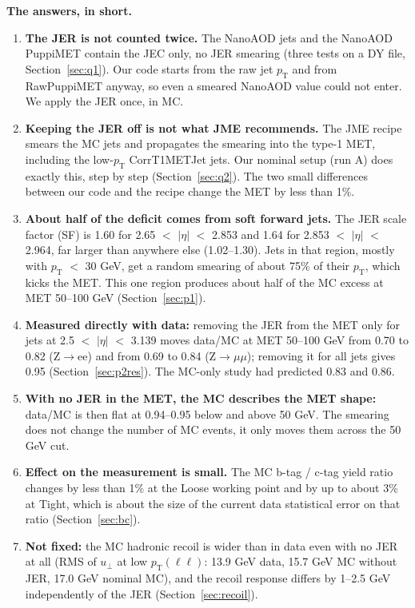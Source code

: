 \documentclass[11pt,a4paper]{article}
\newcommand{\Zee}{Z$\to$ee}
\newcommand{\Zmm}{Z$\to\mu\mu$}
\newcommand{\pt}{$p_\mathrm{T}$}
\newcommand{\aeta}{$|\eta|$}
\begin{document}
\textbf{The answers, in short.}
\begin{enumerate}
\item \textbf{The JER is not counted twice.} The NanoAOD jets and the NanoAOD PuppiMET contain the JEC only, no JER smearing
(three tests on a DY file, Section~\ref{sec:q1}). Our code starts from the raw jet \pt{} and from RawPuppiMET anyway,
so even a smeared NanoAOD value could not enter. We apply the JER once, in MC.
\item \textbf{Keeping the JER off is not what JME recommends.} The JME recipe smears the MC jets and propagates the smearing
into the type-1 MET, including the low-\pt{} CorrT1METJet jets. Our nominal setup (run A) does exactly this, step by step
(Section~\ref{sec:q2}). The two small differences between our code and the recipe change the MET by less than 1\%.
\item \textbf{About half of the deficit comes from soft forward jets.} The JER scale factor (SF) is 1.60 for
2.65 $<$ \aeta{} $<$ 2.853 and 1.64 for 2.853 $<$ \aeta{} $<$ 2.964, far larger than anywhere else (1.02--1.30).
Jets in that region, mostly with \pt{} $<$ 30 GeV, get a random smearing of about 75\% of their \pt{}, which kicks the MET.
This one region produces about half of the MC excess at MET 50--100 GeV (Section~\ref{sec:p1}).
\item \textbf{Measured directly with data:} removing the JER from the MET only for jets at 2.5 $<$ \aeta{} $<$ 3.139 moves
data/MC at MET 50--100 GeV from 0.70 to 0.82 (\Zee) and from 0.69 to 0.84 (\Zmm); removing it for all jets gives 0.95
(Section~\ref{sec:p2res}). The MC-only study had predicted 0.83 and 0.86.
\item \textbf{With no JER in the MET, the MC describes the MET shape:} data/MC is then flat at 0.94--0.95 below and above
50 GeV. The smearing does not change the number of MC events, it only moves them across the 50 GeV cut.
\item \textbf{Effect on the measurement is small.} The MC b-tag / c-tag yield ratio changes by less than 1\% at the Loose
working point and by up to about 3\% at Tight, which is about the size of the current data statistical error on that ratio
(Section~\ref{sec:bc}).
\item \textbf{Not fixed:} the MC hadronic recoil is wider than in data even with no JER at all
(RMS of $u_\perp$ at low $p_\mathrm{T}(\ell\ell)$: 13.9 GeV data, 15.7 GeV MC without JER, 17.0 GeV nominal MC),
and the recoil response differs by 1--2.5 GeV independently of the JER (Section~\ref{sec:recoil}).
\end{enumerate}
\end{document}
